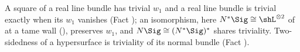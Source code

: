 A square of a real line bundle has trivial $w_1$ and a real line bundle is trivial exactly when its $w_1$ vanishes (Fact ); an isomorphism, here $N^*\Sig \cong \shL^{\otimes 2}$ of  at a tame wall (), preserves $w_1$, and $N\Sig \cong (N^*\Sig)^*$ shares triviality. Two-sidedness of a hypersurface is triviality of its normal bundle (Fact ).

